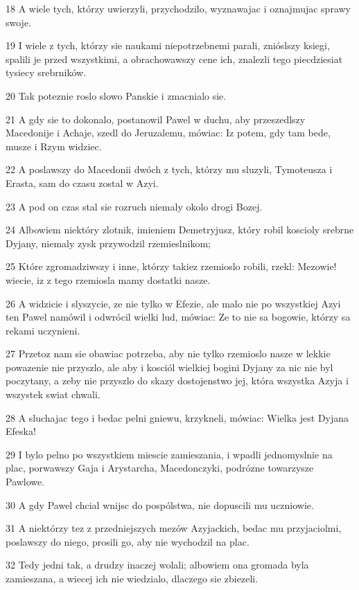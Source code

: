 \par 18 A wiele tych, którzy uwierzyli, przychodzilo, wyznawajac i oznajmujac sprawy swoje.
\par 19 I wiele z tych, którzy sie naukami niepotrzebnemi parali, znióslszy ksiegi, spalili je przed wszystkimi, a obrachowawszy cene ich, znalezli tego piecdziesiat tysiecy srebrników.
\par 20 Tak poteznie roslo slowo Panskie i zmacnialo sie.
\par 21 A gdy sie to dokonalo, postanowil Pawel w duchu, aby przeszedlszy Macedonije i Achaje, szedl do Jeruzalemu, mówiac: Iz potem, gdy tam bede, musze i Rzym widziec.
\par 22 A poslawszy do Macedonii dwóch z tych, którzy mu sluzyli, Tymoteusza i Erasta, sam do czasu zostal w Azyi.
\par 23 A pod on czas stal sie rozruch niemaly okolo drogi Bozej.
\par 24 Albowiem niektóry zlotnik, imieniem Demetryjusz, który robil koscioly srebrne Dyjany, niemaly zysk przywodzil rzemieslnikom;
\par 25 Które zgromadziwszy i inne, którzy takiez rzemioslo robili, rzekl: Mezowie! wiecie, iz z tego rzemiosla mamy dostatki nasze.
\par 26 A widzicie i slyszycie, ze nie tylko w Efezie, ale malo nie po wszystkiej Azyi ten Pawel namówil i odwrócil wielki lud, mówiac: Ze to nie sa bogowie, którzy sa rekami uczynieni.
\par 27 Przetoz nam sie obawiac potrzeba, aby nie tylko rzemioslo nasze w lekkie powazenie nie przyszlo, ale aby i kosciól wielkiej bogini Dyjany za nic nie byl poczytany, a zeby nie przyszlo do skazy dostojenstwo jej, która wszystka Azyja i wszystek swiat chwali.
\par 28 A sluchajac tego i bedac pelni gniewu, krzykneli, mówiac: Wielka jest Dyjana Efeska!
\par 29 I bylo pelno po wszystkiem miescie zamieszania, i wpadli jednomyslnie na plac, porwawszy Gaja i Arystarcha, Macedonczyki, podrózne towarzysze Pawlowe.
\par 30 A gdy Pawel chcial wnijsc do pospólstwa, nie dopuscili mu uczniowie.
\par 31 A niektórzy tez z przedniejszych mezów Azyjackich, bedac mu przyjaciolmi, poslawszy do niego, prosili go, aby nie wychodzil na plac.
\par 32 Tedy jedni tak, a drudzy inaczej wolali; albowiem ona gromada byla zamieszana, a wiecej ich nie wiedzialo, dlaczego sie zbiezeli.
